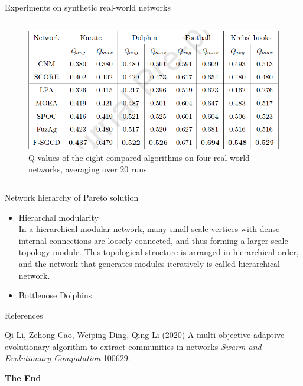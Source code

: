 \documentclass[aspectratio=169,xcolor=dvipsnames]{beamer}
\begin{document}

\begin{frame}{Experiments on synthetic real-world networks}
    \begin{columns}
        \begin{column}{0.5\textwidth}
            \begin{figure}
            \centering
                \includegraphics[width=1\textwidth]{synthetic-realworld.PNG}
                \caption{Q values of the eight compared algorithms on four real-world networks, averaging
                over 20 runs.}
            \end{figure}
        \end{column}
    \end{columns}
\end{frame}


\begin{frame}{Network hierarchy of Pareto solution}
    \begin{itemize}
        \item Hierarchal modularity \\
        In a hierarchical modular network, many small-scale vertices with dense internal connections are loosely connected, and thus forming a larger-scale topology module. This topological structure is arranged in hierarchical order, and the network that generates modules iteratively is called hierarchical network.
        \item Bottlenose Dolphins
    \end{itemize}
\end{frame}


\begin{frame}{References}
    \footnotesize{
        \begin{thebibliography}{99}
             Qi Li, Zehong Cao, Weiping Ding, Qing Li (2020)
            \newblock A multi-objective adaptive evolutionary algorithm to extract communities in networks
            \newblock \emph{Swarm and Evolutionary Computation} 100629.
        \end{thebibliography}
    }
\end{frame}


\begin{frame}
    \Huge{\centerline{\textbf{The End}}}
\end{frame}

\end{document}
